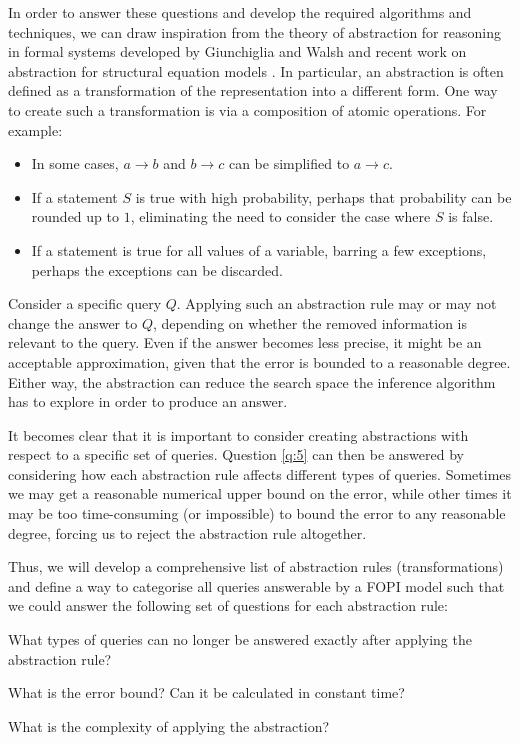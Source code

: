 \documentclass[11pt,english,twocolumn]{article}
\begin{document}
In order to answer these questions and develop the required algorithms and
techniques, we can draw inspiration from the theory of abstraction for reasoning
in formal systems developed by Giunchiglia and Walsh
\cite{DBLP:journals/ai/GiunchigliaW92} and recent work on abstraction for
structural equation models \cite{DBLP:conf/uai/RubensteinWBMJG17}. In
particular, an abstraction is often defined as a transformation of the
representation into a different form. One way to create such a transformation is
via a composition of atomic operations. For example:
\begin{itemize}
\item In some cases, $a \rightarrow b$ and $b \rightarrow c$ can be simplified
  to $a \rightarrow c$.
\item If a statement $S$ is true with high probability, perhaps that probability
  can be rounded up to $1$, eliminating the need to consider the case where $S$
  is false.
\item If a statement is true for all values of a variable, barring a few
  exceptions, perhaps the exceptions can be discarded.
\end{itemize}

Consider a specific query $Q$. Applying such an abstraction rule may or may not
change the answer to $Q$, depending on whether the removed information
is relevant to the query. Even if the answer becomes less precise, it might be
an acceptable approximation, given that the error is bounded to a reasonable
degree. Either way, the abstraction can reduce the search space the inference
algorithm has to explore in order to produce an answer.

It becomes clear that it is important to consider creating abstractions with
respect to a specific set of queries. Question \ref{q:5} can then be answered by
considering how each abstraction rule affects different types of queries.
Sometimes we may get a reasonable numerical upper bound on the error, while
other times it may be too time-consuming (or impossible) to bound the error to
any reasonable degree, forcing us to reject the abstraction rule altogether.

Thus, we will develop a comprehensive list of abstraction rules
(transformations) and define a way to categorise all queries answerable by a
FOPI model such that we could answer the following set of questions for each
abstraction rule:
\begin{itemize*}
\item What types of queries can no longer be answered exactly after applying the
  abstraction rule?
\item What is the error bound? Can it be calculated in constant time?
\item What is the complexity of applying the abstraction?
\end{itemize*}
\end{document}
